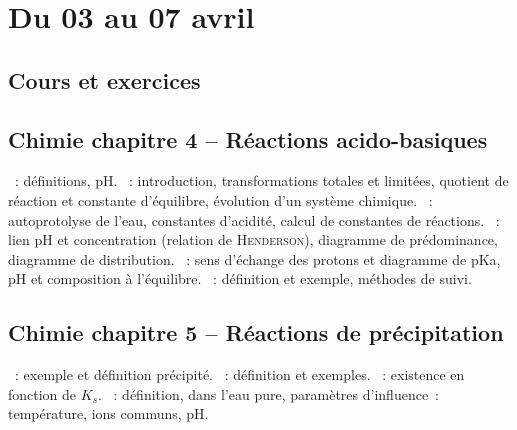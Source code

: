 \documentclass[a4paper, 12pt, final, garamond]{book}
\begin{document}
\setcounter{chapter}{23}

\chapter{Du 03 au 07 avril}

\section{Cours et exercices}
\section*{Chimie chapitre 4 -- Réactions acido-basiques}
\begin{enumerate}[label=\Roman*]
    ~: définitions, pH.
    ~: introduction, transformations totales et
        limitées, quotient de réaction et constante d'équilibre, évolution d'un
        système chimique.
    ~: autoprotolyse de l'eau, constantes
        d'acidité, calcul de constantes de réactions.
    ~: lien pH et concentration
        (relation de \textsc{Henderson}), diagramme de prédominance, diagramme
        de distribution.
    ~: sens d'échange des
        protons et diagramme de pKa, pH et composition à l'équilibre.
    ~: définition et exemple, méthodes de suivi.
\end{enumerate}

\section*{Chimie chapitre 5 -- Réactions de précipitation}
\begin{enumerate}[label=\Roman*]
    ~: exemple et définition précipité.
    ~: définition et exemples.
    ~: existence en fonction de $K_s$.
    ~: définition, dans l'eau pure, paramètres d'influence~:
        température, ions communs, pH.
\end{enumerate}
\end{document}
